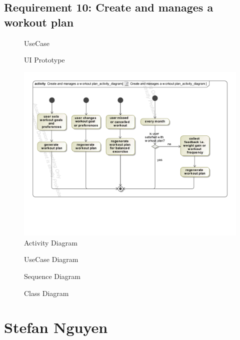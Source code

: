 \documentclass{article}
\begin{document}
	\subsection{Requirement 10: Create and manages a workout plan}
		\begin{figure}[h!]
			\centering
			\captionsetup{labelformat=empty}
			\caption{UseCase}
		\end{figure}
		\newpage
		\begin{figure}[h!]
			\centering
			\captionsetup{labelformat=empty}
			\caption{UI Prototype}
		\end{figure}
		\newpage
		\begin{figure}[h!]
		    \centering
		    \captionsetup{labelformat=empty}
		    \caption{Activity Diagram}
		    \includegraphics[width=\textwidth, angle=0]{Marc/req10/10activity.pdf}
		\end{figure}
		\newpage
		\begin{figure}[h!]
			\centering
			\captionsetup{labelformat=empty}
			\caption{UseCase Diagram}
		\end{figure}
		\newpage
		\begin{figure}[h!]
			\centering
			\captionsetup{labelformat=empty}
			\caption{Sequence Diagram}
		\end{figure}
		\newpage
		\begin{figure}[h!]
			\centering
			\captionsetup{labelformat=empty}
			\caption{Class Diagram}
		\end{figure}
		\newpage
			


\section{Stefan Nguyen}
\end{document}
